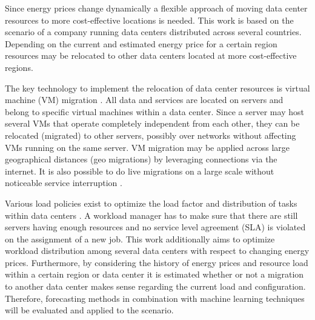 \documentclass[a4paper]{article}
\begin{document}

Since energy prices change dynamically a flexible approach of moving data center resources to more cost-effective locations is needed. This work is based on the scenario of a company running data centers distributed across several countries. Depending on the current and estimated energy price for a certain region resources may be relocated to other data centers located at more cost-effective regions.

The key technology to implement the relocation of data center resources is virtual machine (VM) migration \cite{nelson2009virtual}. All data and services are located on servers and belong to specific virtual machines within a data center. Since a server may host several VMs that operate completely independent from each other, they can be relocated (migrated) to other servers, possibly over networks without affecting VMs running on the same server. VM migration may be applied across large geographical distances (geo migrations) by leveraging connections via the internet. It is also possible to do live migrations on a large scale without noticeable service interruption \cite{celesti2010improving}. 

Various load policies exist to optimize the load factor and distribution of tasks within data centers \cite{buyya2010energy}. A workload manager has to make sure that there are still servers having enough resources and no service level agreement (SLA) is violated on the assignment of a new job. 
This work additionally aims to optimize workload distribution among several data centers with respect to changing energy prices. 
Furthermore, by considering the history of energy prices and resource load within a certain region or data center it is estimated whether or not a migration to another data center makes sense regarding the current load and configuration. Therefore, forecasting methods in combination with machine learning techniques will be evaluated and applied to the scenario. 
\end{document}
